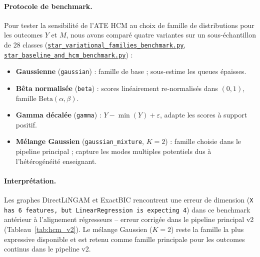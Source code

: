 \documentclass[11pt,a4paper]{article}
\begin{document}
\paragraph{Protocole de benchmark.}
Pour tester la sensibilité de l'ATE HCM au choix de famille de distributions pour les outcomes $Y$ et $M$, nous avons comparé quatre variantes sur un sous-échantillon de 28 classes (\href{https://github.com/janisaiad/hierarchicalcausalmodels/blob/psc/examples/STAR/star_variational_families_benchmark.py}{\texttt{star\_variational\_families\_benchmark.py}}, \href{https://github.com/janisaiad/hierarchicalcausalmodels/blob/psc/examples/STAR/star_baseline_and_hcm_benchmark.py}{\texttt{star\_baseline\_and\_hcm\_benchmark.py}}) :
\begin{itemize}
  \item \textbf{Gaussienne} (\texttt{gaussian}) : famille de base ; sous-estime les queues épaisses.
  \item \textbf{Bêta normalisée} (\texttt{beta}) : scores linéairement re-normalisés dans $(0,1)$, famille $\mathrm{Beta}(\alpha, \beta)$.
  \item \textbf{Gamma décalée} (\texttt{gamma}) : $Y - \min(Y) + \varepsilon$, adapte les scores à support positif.
  \item \textbf{Mélange Gaussien} (\texttt{gaussian\_mixture}, $K=2$) : famille choisie dans le pipeline principal ; capture les modes multiples potentiels dus à l'hétérogénéité enseignant.
\end{itemize}

\paragraph{Interprétation.}
Les graphes DirectLiNGAM et ExactBIC rencontrent une erreur de dimension (\texttt{X has 6 features, but LinearRegression is expecting 4}) dans ce benchmark antérieur à l'alignement régresseurs -- erreur corrigée dans le pipeline principal v2 (Tableau~\ref{tab:hcm_v2}). Le mélange Gaussien ($K=2$) reste la famille la plus expressive disponible et est retenu comme famille principale pour les outcomes continus dans le pipeline v2.
\end{document}
